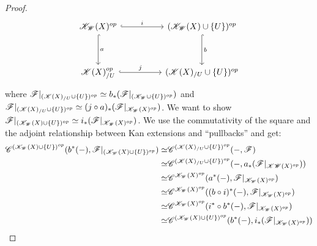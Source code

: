 \documentclass[../../thesis.tex]{subfiles}
\begin{document}
\begin{proof}
    \[\begin{tikzcd}
            {\K_{\W}(X)^{op}} && {(\K_{\W}(X)\cup \{U\})^{op}} \\
            \\
            {\K(X)_{/U}^{op}} && {(\K(X)_{/U} \cup \{U\})^{op}}
            \arrow["{b}", hook, from=1-3, to=3-3]
            \arrow["{j}", hook, from=3-1, to=3-3]
            \arrow["{a}", hook, from=1-1, to=3-1]
            \arrow["{i}" ,hook, from=1-1, to=1-3]
        \end{tikzcd}\]
    where $\mathscr{F}|_{(\mathscr{K}(X)_{/U} \cup \{ U \})^{op}} \simeq b_*(\mathscr{F}|_{(\mathscr{K}_{\mathscr{W}} \cup \{U\})^{op}})$ and $\mathscr{F}|_{(\mathscr{K}(X)_{/U} \cup \{U\})^{op}} \simeq (j\circ a)_*(\mathscr{F}|_{\mathscr{K}_{\mathscr{W}}(X)^{op}})$.
    We want to show $\mathscr{F}|_{(\mathscr{K}_{\mathscr{W}}(X) \cup \{U\})^{op}} \simeq i_*(\mathscr{F}|_{\mathscr{K}_{\mathscr{W}}(X)^{op}})$.
    We use the commutativity of the square and the adjoint relationship between Kan extensions and ``pullbacks'' and get:
    \begin{align}
        \C^{(\K_{\W}(X)\cup \{U\})^{op}}(b^*(\blank),\F|_{(\K_{\W}(X)\cup \{U\})^{op}})\simeq & \C^{(\K(X)_{/U} \cup \{U\})^{op}}(\blank, \F)                             \\       \simeq                                                                             & \C^{(\K(X)_{/U} \cup \{U\})^{op}}(\blank,a_*(\F|_{{\K\W}(X)^{op}})) \\
        \simeq                                                                                & \C^{\K_{\W}(X)^{op}}(a^*(\blank), \F|_{\K_{\W}(X)^{op}})                  \\
        \simeq                                                                                & \C^{\K_{\W}(X)^{op}}((b\circ i)^*(\blank), \F|_{\K_{\W}(X)^{op}})         \\        \simeq                                                                             & \C^{\K_{\W}(X)^{op}}(i^* \circ b^*(\blank), \F|_{\K_{\W}(X)^{op}})            \\
        \simeq                                                                                & \C^{(\K_{\W}(X)\cup \{U\})^{op}}(b^*(\blank), i_*(\F|_{\K_{\W}(X)^{op}}))

\end{align}
\end{proof}
\end{document}
